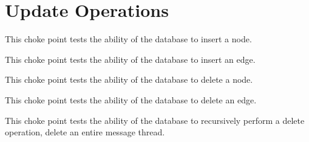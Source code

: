 


\section{Update Operations}



This choke point tests the ability of the database to insert a node.





This choke point tests the ability of the database to insert an edge.





This choke point tests the ability of the database to delete a node.





This choke point tests the ability of the database to delete an edge.





This choke point tests the ability of the database to recursively perform a delete operation, \eg delete an entire message thread.


